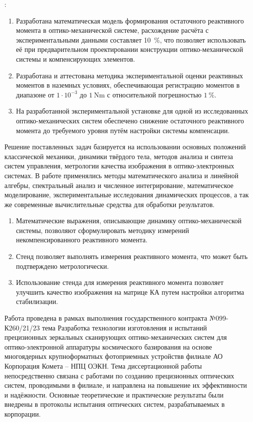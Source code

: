 {\influence}:

\begin{enumerate}[beginpenalty=10000] %
	\item Разработана математическая модель формирования остаточного реактивного момента в оптико-механической системе, расхождение расчёта с экспериментальными данными составляет 10~\%, что позволяет использовать её при предварительном проектировании конструкции оптико-механической системы и компенсирующих элементов.
	\item Разработана и аттестована методика экспериментальной оценки реактивных моментов в наземных условиях, обеспечивающая регистрацию моментов в диапазоне от $1 \cdot 10^{-3}$ до $\SI{1}{\newton\meter}$ с относительной погрешностью $1 ~\%$.
	\item На разработанной экспериментальной установке для одной из исследованных оптико-механических систем обеспечено снижение остаточного реактивного момента до требуемого уровня путём настройки системы компенсации.
\end{enumerate}


{\methods} Решение поставленных задач базируется на использовании основных положений классической механики, динамики твёрдого тела, методов анализа и синтеза систем управления, метрологии качества изображения в оптико-электронных системах. В работе применялись методы математического анализа и линейной алгебры, спектральный анализ и численное интегрирование, математическое моделирование, экспериментальные исследования динамических процессов, а так же современные вычислительные средства для обработки результатов.


{}
\begin{enumerate}[beginpenalty=10000] %
  \item Математические выражения, описывающие динамику оптико-механической системы, позволяют сформулировать методику измерений некомпенсированного реактивного момента.
  \item Стенд позволяет выполнять измерения реактивного момента, что может быть подтверждено метрологически.
  \item Использование стенда для измерения реактивного момента позволяет улучшить качество изображения на матрице КА путем настройки алгоритма стабилизации.
\end{enumerate}

{\realisation} Работа проведена в рамках выполнения государственного контракта №099-К260/21/23 тема \flqq Разработка технологии изготовления и испытаний прецизионных зеркальных сканирующих оптико-механических систем для оптико-электронной аппаратуры космического базирования на основе многоядерных крупноформатных фотоприемных устройств\frqq  в филиале АО \flqq Корпорация \glqq Комета \grqq -- \glqq НПЦ ОЭКН\grqq \frqq. Тема диссертационной работы непосредственно связана с работами по созданию прецизионных оптических систем, проводимыми в филиале, и направлена на повышение их эффективности и надёжности. Основные теоретические и практические результаты были внедрены в протоколы испытания оптических систем, разрабатываемых в корпорации.

